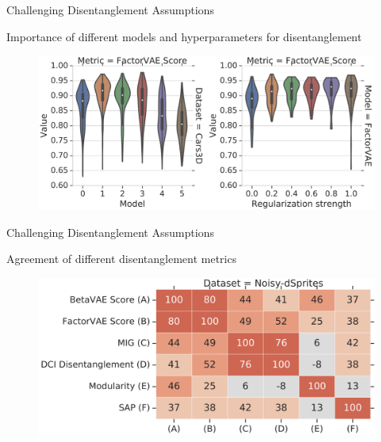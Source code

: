 \begin{frame}{Challenging Disentanglement Assumptions}
	\begin{block}{Importance of different models and hyperparameters for disentanglement}
		\begin{figure}
			\centering
			\includegraphics[width=\linewidth]{figs/challenge_dis_2}
		\end{figure}
	\end{block}

\end{frame}
\begin{frame}{Challenging Disentanglement Assumptions}
	\begin{block}{Agreement of different disentanglement metrics}
		\begin{figure}
			\centering
			\includegraphics[width=0.9\linewidth]{figs/challenge_dis_3}
		\end{figure}
		\vspace{0.5cm}
	\end{block}

\end{frame}
